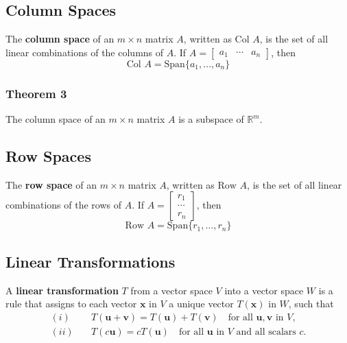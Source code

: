 \documentclass{article}
\begin{document}
\vspace{1em}

\subsection*{Column Spaces}
The \textbf{column space} of an $m\times n$ matrix $A$, written as $\text{Col } A$, is the set of all linear combinations of the columns of $A$. If $A=\begin{bmatrix}a_1 & \cdots & a_n\end{bmatrix}$, then
\[\text{Col } A = \text{Span}\{a_1, \ldots, a_n\}\]

\subsubsection*{Theorem 3}
The column space of an $m\times n$ matrix $A$ is a subspace of $\mathbb{R}^m$.

\subsection*{Row Spaces}
The \textbf{row space} of an $m\times n$ matrix $A$, written as $\text{Row } A$, is the set of all linear combinations of the rows of $A$. If $A=\begin{bmatrix}r_1 \\ \cdots \\ r_n\end{bmatrix}$, then
\[\text{Row } A = \text{Span}\{r_1, \ldots, r_n\}\]

\subsection*{Linear Transformations}
A \textbf{linear transformation} $T$ from a vector space $V$ into a vector space $W$ is a rule that assigns to each vector $\mathbf{x}$ in $V$ a unique vector $T(\mathbf{x})$ in $W$, such that
\begin{align*}
    (i) &\quad T(\mathbf{u} + \mathbf{v}) = T(\mathbf{u}) + T(\mathbf{v}) \quad \text{for all } \mathbf{u}, \mathbf{v} \text{ in } V, \\
    (ii) &\quad T(c \mathbf{u}) = c T(\mathbf{u}) \quad \text{for all } \mathbf{u} \text{ in } V \text{ and all scalars } c.
\end{align*}
\end{document}
